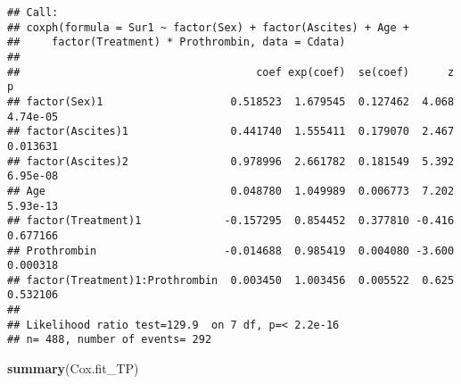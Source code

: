 \documentclass[
]{article}
\newenvironment{Shaded}{\begin{snugshade}}{\end{snugshade}}
\newcommand{\KeywordTok}[1]{\textcolor[rgb]{0.13,0.29,0.53}{\textbf{#1}}}
\newcommand{\NormalTok}[1]{#1}
\begin{document}
\begin{verbatim}
## Call:
## coxph(formula = Sur1 ~ factor(Sex) + factor(Ascites) + Age + 
##     factor(Treatment) * Prothrombin, data = Cdata)
## 
##                                     coef exp(coef)  se(coef)      z        p
## factor(Sex)1                    0.518523  1.679545  0.127462  4.068 4.74e-05
## factor(Ascites)1                0.441740  1.555411  0.179070  2.467 0.013631
## factor(Ascites)2                0.978996  2.661782  0.181549  5.392 6.95e-08
## Age                             0.048780  1.049989  0.006773  7.202 5.93e-13
## factor(Treatment)1             -0.157295  0.854452  0.377810 -0.416 0.677166
## Prothrombin                    -0.014688  0.985419  0.004080 -3.600 0.000318
## factor(Treatment)1:Prothrombin  0.003450  1.003456  0.005522  0.625 0.532106
## 
## Likelihood ratio test=129.9  on 7 df, p=< 2.2e-16
## n= 488, number of events= 292
\end{verbatim}

\begin{Shaded}
\begin{Highlighting}[]
\KeywordTok{summary}\NormalTok{(Cox.fit_TP)}
\end{Highlighting}
\end{Shaded}
\end{document}
